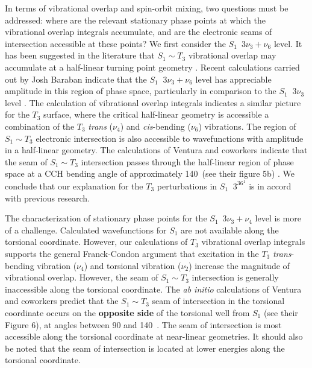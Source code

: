 In terms of vibrational overlap and spin-orbit mixing, two questions
must be addressed: where are the relevant stationary phase points at
which the vibrational overlap integrals accumulate, and are the
electronic seams of intersection accessible at these points?  We first
consider the $S_1 \:\; 3\nu_3 + \nu_6$ level.  It has been suggested
in the literature that $S_1 \sim T_3$ vibrational overlap may
accumulate at a half-linear turning point geometry \cite{mizoguchi00}.
Recent calculations carried out by Josh Baraban indicate that the $S_1
\;\; 3\nu_3 + \nu_6$ level has appreciable amplitude in this region of
phase space, particularly in comparison to the $S_1 \;\; 3\nu_3$ level
\cite{baraban08}.  The calculation of vibrational overlap integrals
indicates a similar picture for the $T_3$ surface, where the critical
half-linear geometry is accessible a combination of the $T_3$
\emph{trans} ($\nu_4$) and \emph{cis}-bending ($\nu_6$) vibrations.
The region of $S_1 \sim T_3$ electronic intersection is also
accessible to wavefunctions with amplitude in a half-linear geometry.
The calculations of Ventura and coworkers indicate that the seam of
$S_1 \sim T_3$ intersection passes through the half-linear region of
phase space at a CCH bending angle of approximately 140\degrees\ (see
their figure 5b) \cite{ventura03}.  We conclude that our explanation
for the $T_3$ perturbations in $S_1 \;\; 3^36^1$  is in accord
with previous research.

The characterization of stationary phase points for the $S_1 \:\;
3\nu_3 + \nu_4$ level is more of a challenge.  Calculated
wavefunctions for $S_1$ are not available along the torsional
coordinate.  However, our calculations of $T_3$ vibrational overlap
integrals supports the general Franck-Condon argument that excitation
in the $T_3$ \emph{trans}-bending vibration ($\nu_4$) and torsional
vibration ($\nu_2$) increase the magnitude of vibrational overlap.
However, the seam of $S_1 \sim T_3$ intersection is generally
inaccessible along the torsional coordinate.  The \emph{ab initio}
calculations of Ventura and coworkers predict that the $S_1 \sim T_3$
seam of intersection in the torsional coordinate occurs on the
\textbf{opposite side} of the torsional well from $S_1$ (see their
Figure 6), at angles between 90 and 140\degrees\ \cite{ventura03}.
The seam of intersection is most accessible along the torsional
coordinate at near-linear geometries.  It should also be noted
that the seam of intersection is located at lower energies along the
torsional coordinate.

